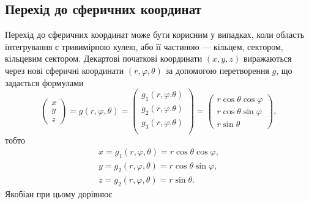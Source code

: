 \subsection{Перехід до сферичних координат}
Перехід до сферичних координат може бути корисним у випадках, коли область інтегрування є тривимірною кулею, або її частиною --- кільцем, сектором, кільцевим сектором. Декартові початкові координати ${\left(x, y, z\right)}$ виражаються через нові сферичні координати ${\left(r, \varphi, \theta\right)}$ за допомогою перетворення $g$, що задається формулами
\[
\left(\begin{array}{c}x\\y\\z\end{array}\right) = g\left(r, \varphi, \theta\right) =
\left(
\begin{array}{c}
g_1\left(r,\varphi. \theta\right)\\
g_2\left(r,\varphi. \theta\right)\\
g_3\left(r,\varphi. \theta\right)\\
\end{array}
\right)=
\left(
\begin{array}{c}
r\cos\theta\cos\varphi\\
r\cos\theta\sin\varphi\\
r\sin\theta
\end{array}
\right),
\]
тобто
\begin{align*}
x = g_1\left(r, \varphi, \theta\right)= r \cos\theta \cos\varphi,\\
y = g_2\left(r, \varphi, \theta\right)= r \cos\theta \sin\varphi,\\
z = g_2\left(r, \varphi, \theta\right)= r \sin\theta.
\end{align*}
Якобіан при цьому дорівнює
